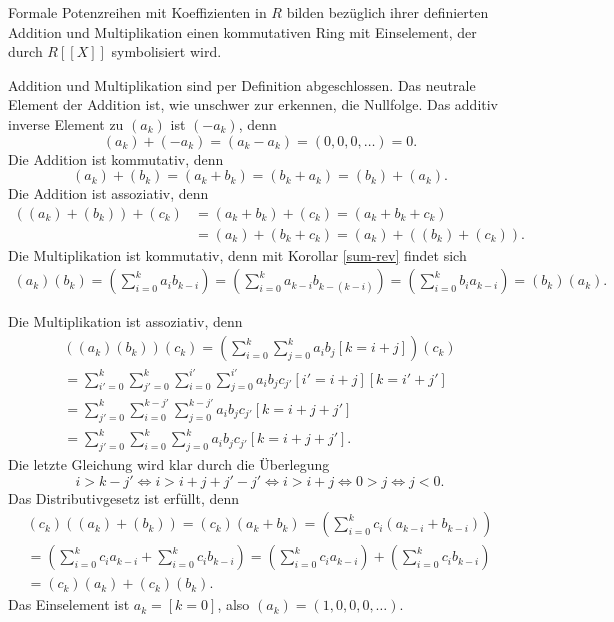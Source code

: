 \begin{Korollar}
Formale Potenzreihen mit Koeffizienten in $R$ bilden bezüglich ihrer
definierten Addition und Multiplikation einen kommutativen
Ring mit Einselement, der durch $R[[X]]$ symbolisiert wird.
\end{Korollar}
\begin{Beweis}
Addition und Multiplikation sind per Definition abgeschlossen.
Das neutrale Element der Addition ist, wie unschwer zur erkennen,
die Nullfolge. Das additiv inverse Element zu $(a_k)$ ist $(-a_k)$, denn%
\[(a_k) + (-a_k) = (a_k - a_k) = (0, 0, 0, \ldots) = 0.\]
Die Addition ist kommutativ, denn
\[(a_k) + (b_k) = (a_k + b_k) = (b_k + a_k) = (b_k) + (a_k).\]
Die Addition ist assoziativ, denn
\begin{align*}
((a_k) + (b_k)) + (c_k) &= (a_k + b_k) + (c_k) = (a_k + b_k + c_k)\\
&= (a_k) + (b_k + c_k) = (a_k) + ((b_k) + (c_k)).
\end{align*}
Die Multiplikation ist kommutativ, denn mit Korollar \ref{sum-rev}
findet sich
\begin{gather*}
\textstyle (a_k)(b_k) = (\sum_{i=0}^k a_i b_{k-i})
= (\sum_{i=0}^k a_{k-i}b_{k-(k-i)})
= (\sum_{i=0}^k b_i a_{k-i}) = (b_k)(a_k).
\end{gather*}
\end{Beweis}
Die Multiplikation ist assoziativ, denn
\begin{gather*}
\textstyle
((a_k)(b_k))(c_k) = (\sum_{i=0}^k\sum_{j=0}^k a_i b_j[k{=}i{+}j])(c_k)\\
\textstyle
= \sum_{i'=0}^k\sum_{j'=0}^k\sum_{i=0}^{i'}\sum_{j=0}^{i'} a_i b_j c_{j'}[i'{=}i{+}j][k{=}i'{+}j']\\
\textstyle
= \sum_{j'=0}^k\sum_{i=0}^{k-j'}\sum_{j=0}^{k-j'} a_i b_j c_{j'}[k{=}i{+}j{+}j']\\
\textstyle
= \sum_{j'=0}^k\sum_{i=0}^k\sum_{j=0}^k a_i b_j c_{j'}[k{=}i{+}j{+}j'].
\end{gather*}
Die letzte Gleichung wird klar durch die Überlegung
\[i > k-j'\iff i > i+j+j'-j'\iff i > i+j \iff 0 > j\iff j < 0.\]
Das Distributivgesetz ist erfüllt, denn
\begin{gather*}
\textstyle (c_k)((a_k)+(b_k)) =  (c_k)(a_k + b_k)
= (\sum_{i=0}^k c_i (a_{k-i} + b_{k-i}))\\
\textstyle
= (\sum_{i=0}^k c_i a_{k-i} + \sum_{i=0}^k c_i b_{k-i})
= (\sum_{i=0}^k c_i a_{k-i}) + (\sum_{i=0}^k c_i b_{k-i})\\
\textstyle
= (c_k)(a_k) + (c_k)(b_k).
\end{gather*}
Das Einselement ist $a_k=[k=0]$, also $(a_k) = (1,0,0,0,\ldots)$.\,\qedsymbol


